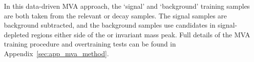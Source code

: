 In this data-driven MVA approach, the `signal' and `background' training samples are both taken from the relevant \decay{\Bsb}{\Dsp\pim} or \decay{\Bs}{\jpsi\phiz} decay samples. The signal samples are background subtracted, and the background samples use candidates in signal-depleted regions either side of the \Dsp or \phiz invariant mass peak.
Full details of the MVA training procedure and overtraining tests can be found in Appendix~\ref{sec:app_mva_method}.








